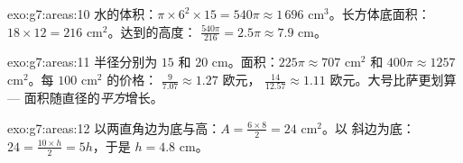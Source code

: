 \begin{solution}{exo:g7:areas:10}
水的体积：$\pi \times 6^2 \times 15 = 540\pi \approx 1\,696$
cm$^3$。长方体底面积：$18 \times 12 = 216$ cm$^2$。达到的高度：
$\frac{540\pi}{216} = 2.5\pi \approx 7.9$ cm。
\end{solution}

\begin{solution}{exo:g7:areas:11}
半径分别为 $15$ 和 $20$ cm。面积：$225\pi \approx 707$ cm$^2$ 和
$400\pi \approx 1257$ cm$^2$。每 $100$ cm$^2$ 的价格：
$\frac{9}{7.07} \approx 1.27$ 欧元，
$\frac{14}{12.57} \approx 1.11$ 欧元。大号比萨更划算
--- 面积随直径的\emph{平方}增长。
\end{solution}

\begin{solution}{exo:g7:areas:12}
以两直角边为底与高：$A = \frac{6 \times 8}{2} = 24$ cm$^2$。以
斜边为底：$24 = \frac{10 \times h}{2} = 5h$，于是
$h = 4.8$ cm。
\end{solution}

